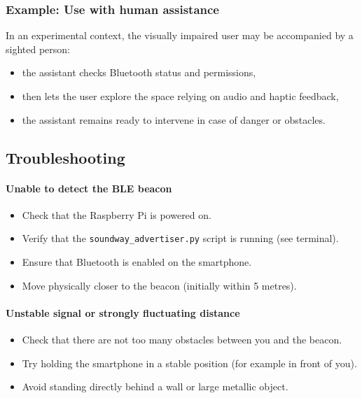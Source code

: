 \documentclass[12pt,a4paper]{article}
\begin{document}
\subsubsection{Example: Use with human assistance}

In an experimental context, the visually impaired user may be accompanied by a sighted person:
\begin{itemize}
    \item the assistant checks Bluetooth status and permissions,
    \item then lets the user explore the space relying on audio and haptic feedback,
    \item the assistant remains ready to intervene in case of danger or obstacles.
\end{itemize}

\newpage
\subsection{Troubleshooting}

\paragraph{Unable to detect the BLE beacon}
\begin{itemize}
    \item Check that the Raspberry Pi is powered on.
    \item Verify that the \texttt{soundway\_advertiser.py} script is running (see terminal).
    \item Ensure that Bluetooth is enabled on the smartphone.
    \item Move physically closer to the beacon (initially within 5 metres).
\end{itemize}

\paragraph{Unstable signal or strongly fluctuating distance}
\begin{itemize}
    \item Check that there are not too many obstacles between you and the beacon.
    \item Try holding the smartphone in a stable position (for example in front of you).
    \item Avoid standing directly behind a wall or large metallic object.
\end{itemize}
\end{document}
